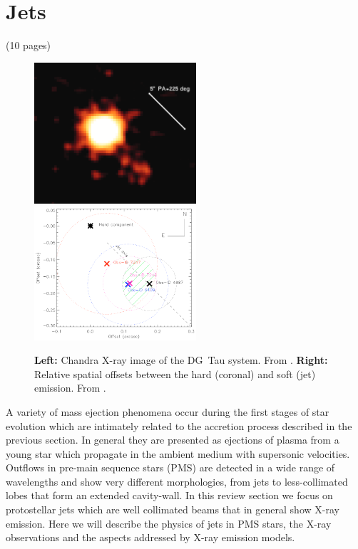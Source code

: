 
\section{Jets}
 {\color{blue}        (10 pages)}
 
 

\begin{figure}[t]

\includegraphics[width=6cm]{figs/dg_tau_X}
\includegraphics[width=6cm]{figs/dg_tau_offsets}

\caption{{\bf Left: } Chandra X-ray image of the DG~Tau system. From \citet{2011ASPC..448..617G}.
         {\bf Right: } Relative spatial offsets between the hard (coronal) and soft (jet) emission. From \citet{Schneider_2008}. \label{fig:dg_tau_X}}
\end{figure}

 
 A variety of mass ejection phenomena occur during the first stages of star evolution which are intimately related to the accretion process described in the previous section. In general they are presented as ejections of plasma from a young star which propagate in the ambient medium with supersonic velocities. Outflows in pre-main sequence stars (PMS) are detected in a wide range of wavelengths and show very different morphologies, from jets to less-collimated lobes that form an extended cavity-wall. In this review section we focus on protostellar jets which are well collimated beams that in general show X-ray emission. Here we will describe the physics of jets in PMS stars, the X-ray observations and the aspects addressed by X-ray emission models.
 
